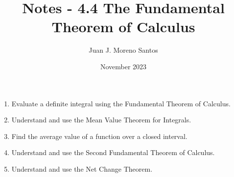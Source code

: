 \documentclass[11pt]{article}
\begin{document}
\title{Notes - 4.4 The Fundamental Theorem of Calculus}
\author{Juan J. Moreno Santos}
\date{November 2023}

\maketitle

\begin{enumerate}
    \item Evaluate a definite integral using the Fundamental Theorem of Calculus.
    \item Understand and use the Mean Value Theorem for Integrals.
    \item Find the average value of a function over a closed interval.
    \item Understand and use the Second Fundamental Theorem of Calculus.
    \item Understand and use the Net Change Theorem.
\end{enumerate}
\end{document}
